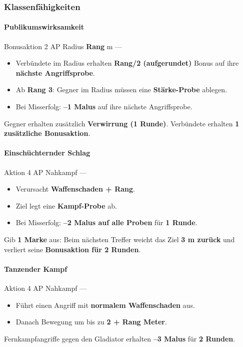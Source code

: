 \subsubsection*{Klassenfähigkeiten}

\paragraph*{Publikumswirksamkeit}

\skillcard
{}
{Bonusaktion}
{2 AP}
{Radius \textbf{Rang} m}
{—}
{
	\begin{itemize}
		\item Verbündete im Radius erhalten \textbf{Rang/2 (aufgerundet)}
		Bonus auf ihre \textbf{nächste Angriffsprobe}.
		\item Ab \textbf{Rang 3}: Gegner im Radius müssen eine
		\textbf{Stärke-Probe} ablegen.
		\item Bei Misserfolg: \textbf{--1 Malus} auf ihre nächste Angriffsprobe.
	\end{itemize}
}
{
	Gegner erhalten zusätzlich \textbf{Verwirrung (1 Runde)}.
	Verbündete erhalten \textbf{1 zusätzliche Bonusaktion}.
}

\paragraph*{Einschüchternder Schlag}

\skillcard
{}
{Aktion}
{4 AP}
{Nahkampf}
{—}
{
	\begin{itemize}
		\item Verursacht \textbf{Waffenschaden + Rang}.
		\item Ziel legt eine \textbf{Kampf-Probe} ab.
		\item Bei Misserfolg: \textbf{--2 Malus auf alle Proben} für \textbf{1 Runde}.
	\end{itemize}
}
{
	Gib \textbf{1 Marke} aus:
	Beim nächsten Treffer weicht das Ziel \textbf{3 m zurück}
	und verliert seine \textbf{Bonusaktion für 2 Runden}.
}

\paragraph*{Tanzender Kampf}

\skillcard
{}
{Aktion}
{4 AP}
{Nahkampf}
{—}
{
	\begin{itemize}
		\item Führt einen Angriff mit \textbf{normalem Waffenschaden} aus.
		\item Danach Bewegung um bis zu \textbf{2 + Rang Meter}.
	\end{itemize}
}
{
	Fernkampfangriffe gegen den Gladiator erhalten
	\textbf{--3 Malus} für \textbf{2 Runden}.
}

